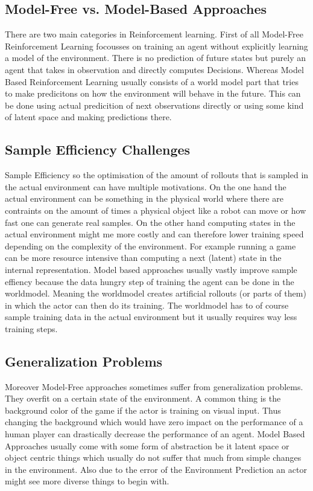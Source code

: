 \documentclass[
	english,
	ruledheaders=section,
	class=report,
	thesis={type=master},
	accentcolor=9c,
	custommargins=true,
	marginpar=false,
	parskip=half-,
	fontsize=11pt,
]{tudapub}
\begin{document}
\subsection{Model-Free vs. Model-Based Approaches}
\label{subsec:mf_vs_mb}
There are two main categories in Reinforcement learning. First of all Model-Free Reinforcement Learning focousses on training an agent without explicitly learning a model of the environment. There is no prediction of future states but purely an agent that takes in observation and directly computes Decisions. Whereas Model Based Reinforcement Learning usually consists of a world model part that tries to make predicitons on how the environment will behave in the future. This can be done using actual predicition of next observations directly or using some kind of latent space and making predictions there.


\subsection{Sample Efficiency Challenges}
\label{subsec:sample_efficiency}
Sample Efficiency so the optimisation of the amount of rollouts that is sampled in the actual environment can have multiple motivations. On the one hand the actual environment can be something in the physical world where there are contraints on the amount of times a physical object like a robot can move or how fast one can generate real samples. On the other hand computing states in the actual environment might me more costly and can therefore lower training speed depending on the complexity of the environment. For example running a game can be more resource intensive than computing a next (latent) state in the internal representation.
Model based approaches usually vastly improve sample effiency because the data hungry step of training the agent can be done in the worldmodel. Meaning the worldmodel creates artificial rollouts (or parts of them) in which the actor can then do its training. The worldmodel has to of course sample training data in the actual environment but it usually requires way less training steps.

\subsection{Generalization Problems}
\label{subsec:generalization}
Moreover Model-Free approaches  sometimes suffer from generalization problems. They overfit on a certain state of the environment. A common thing is the background color of the game if the actor is training on visual input. Thus changing the background which would have zero impact on the performance of a human player can drastically decrease the performance of an agent. Model Based Approaches usually come with some form of abstraction be it latent space or object centric things which usually do not suffer that much from simple changes in the environment. Also due to the error of the Environment Prediction an actor might see more diverse things to begin with.
\end{document}
